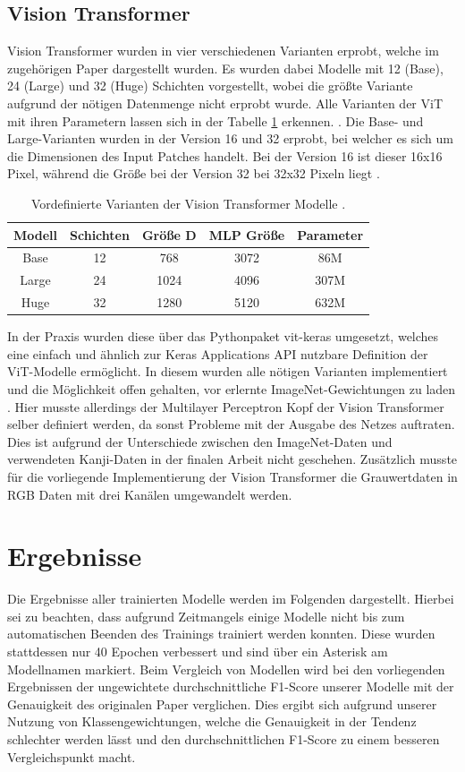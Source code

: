 \documentclass[twoside,a4paper]{IEEEtran}
\begin{document}
\subsection{Vision Transformer} %
Vision Transformer wurden in vier verschiedenen Varianten erprobt, welche im zugehörigen Paper dargestellt wurden. Es wurden dabei Modelle mit 12 (Base), 24 (Large) und 32 (Huge) Schichten vorgestellt, wobei die größte Variante aufgrund der nötigen Datenmenge nicht erprobt wurde. Alle Varianten der ViT mit ihren Parametern lassen sich in der Tabelle \ref{vit_sizes} erkennen. \cite[S.5]{VIT}. Die Base- und Large-Varianten wurden in der Version 16 und 32 erprobt, bei welcher es sich um die Dimensionen des Input Patches handelt. Bei der Version 16 ist dieser 16x16 Pixel, während die Größe bei der Version 32 bei 32x32 Pixeln liegt \cite[S.5]{VIT}. 
\begin{table}[!htb]
	\caption{Vordefinierte Varianten der Vision Transformer Modelle \cite[S.5]{VIT}.}
	\label{vit_sizes}
	\centering
	\begin{tabular}{|c|c|c|c|c|}
		\hline
		Modell & Schichten & Größe D & MLP Größe & Parameter\\
		\hline
		\hline
		Base & 12 & 768 & 3072 & 86M\\
		\hline
		Large & 24 & 1024 & 4096 & 307M\\
		\hline
		Huge & 32 & 1280 & 5120 & 632M\\
		\hline 
	\end{tabular}
\end{table}

In der Praxis wurden diese über das Pythonpaket vit-keras umgesetzt, welches eine einfach und ähnlich zur Keras Applications API nutzbare Definition der ViT-Modelle ermöglicht. In diesem wurden alle nötigen Varianten implementiert und die Möglichkeit offen gehalten, vor erlernte ImageNet-Gewichtungen zu laden \cite{git_vit}.  Hier musste allerdings der Multilayer Perceptron Kopf der Vision Transformer selber definiert werden, da sonst Probleme mit der Ausgabe des Netzes auftraten. Dies ist aufgrund der Unterschiede zwischen den ImageNet-Daten und verwendeten Kanji-Daten in der finalen Arbeit nicht geschehen. Zusätzlich musste für die vorliegende Implementierung der Vision Transformer die Grauwertdaten in RGB Daten mit drei Kanälen umgewandelt werden. 
\section{Ergebnisse} %
Die Ergebnisse aller trainierten Modelle werden im Folgenden dargestellt. Hierbei sei zu beachten, dass aufgrund Zeitmangels einige Modelle nicht bis zum automatischen Beenden des Trainings trainiert werden konnten. Diese wurden stattdessen nur 40 Epochen verbessert und sind über ein Asterisk am Modellnamen markiert. Beim Vergleich von Modellen wird bei den vorliegenden Ergebnissen der ungewichtete durchschnittliche F1-Score unserer Modelle mit der Genauigkeit des originalen Paper verglichen. Dies ergibt sich aufgrund unserer Nutzung von Klassengewichtungen, welche die Genauigkeit in der Tendenz schlechter werden lässt und den durchschnittlichen F1-Score zu einem besseren Vergleichspunkt macht. 
\end{document}
